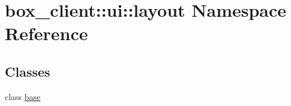 \hypertarget{namespacebox__client_1_1ui_1_1layout}{
\section{box\_\-client::ui::layout Namespace Reference}
\label{namespacebox__client_1_1ui_1_1layout}
}
\subsection*{Classes}
\begin{DoxyCompactItemize}
\item 
class \hyperlink{classbox__client_1_1ui_1_1layout_1_1base}{base}
\end{DoxyCompactItemize}
